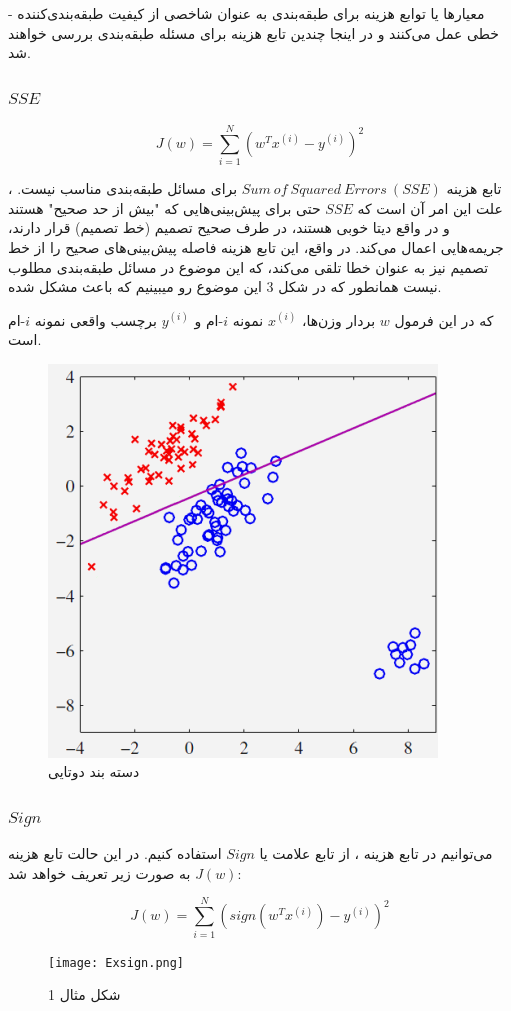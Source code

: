 \documentclass[12pt]{article}
\begin{document}
- معیارها یا توابع هزینه برای طبقه‌بندی به عنوان شاخصی از کیفیت طبقه‌بندی‌کننده خطی عمل می‌کنند و در اینجا چندین تابع هزینه برای مسئله طبقه‌بندی بررسی خواهند شد.
\subsubsection{$SSE$}

\[ J(w) = \sum_{i=1}^{N} (w^T x^{(i)} - y^{(i)})^2 \]

، تابع هزینه $Sum\:of\:Squared\:Errors\:(SSE)$ برای مسائل طبقه‌بندی مناسب نیست. علت این امر آن است که $SSE$ حتی برای پیش‌بینی‌هایی که "بیش از حد صحیح" هستند و در واقع دیتا خوبی هستند، در طرف صحیح تصمیم (خط تصمیم) قرار دارند، جریمه‌هایی اعمال می‌کند. در واقع، این تابع هزینه فاصله پیش‌بینی‌های صحیح را از خط تصمیم نیز به عنوان خطا تلقی می‌کند، که این موضوع در مسائل طبقه‌بندی مطلوب نیست همانطور که در شکل 3 این موضوع رو میبینیم که باعث مشکل شده.

که در این فرمول \( w \) بردار وزن‌ها، \( x^{(i)} \) نمونه $i$-ام و \( y^{(i)} \) برچسب واقعی نمونه $i$-ام است. 
\begin{figure}
    \centering
    \includegraphics[width=0.5\linewidth]{image3.png}
    \caption{دسته بند دوتایی}
    \label{fig:enter-label}
\end{figure}

\subsubsection{$Sign$}

می‌توانیم در تابع هزینه ، از تابع علامت یا $Sign$ استفاده کنیم. در این حالت تابع هزینه \( J(w) \) به صورت زیر تعریف خواهد شد:

\[ J(w) = \sum_{i=1}^{N} (\text{$sign$}(w^Tx^{(i)}) - y^{(i)})^2 \]


\begin{figure}
    \centering
    \texttt{[image: Exsign.png]}
    \caption{شکل مثال 1}
\label{fig:f1}
\end{figure}
\end{document}
